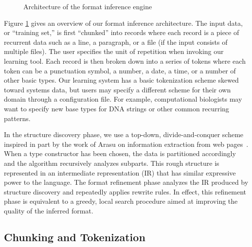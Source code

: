 
\begin{figure}
\begin{center}
\caption{Architecture of the format inference engine}
\vspace*{-5mm}
\label{fig-archi}
\end{center}
\end{figure}

Figure \ref{fig-archi} gives an overview of our format inference
architecture. The input data, or ``training set,'' is first
``chunked'' into records where each record is a piece of recurrent
data such as a line, a paragraph, or a file (if the input consists of
multiple files).  The user specifies the unit of repetition when
invoking our learning tool.  Each record is then broken down into a
series of tokens where each token can be a punctuation symbol, a
number, a date, a time, or a number of other basic types.  Our
learning system has a basic tokenization scheme skewed toward systems
data, but users may specify a different scheme for their own domain
through a configuration file.  For example, computational biologists
may want to specify new base types for DNA strings or other common
recurring patterns.

In the structure discovery phase, we use a top-down, divide-and-conquer
scheme inspired in part by the work of Arasu on
information extraction from web pages~\cite{arasu+:sigmod03}. 
When a type constructor has been chosen, the data is partitioned accordingly
and the algorithm recursively analyzes subparts.  This
rough structure is represented in an intermediate representation (IR)
that has similar expressive power to the \pads{} language. 
The format refinement phase analyzes the IR produced by structure discovery
and repeatedly applies rewrite rules.  
In effect, this refinement phase is equivalent to a greedy, local search
procedure aimed at improving the quality of the inferred format.

\subsection {Chunking and Tokenization}

